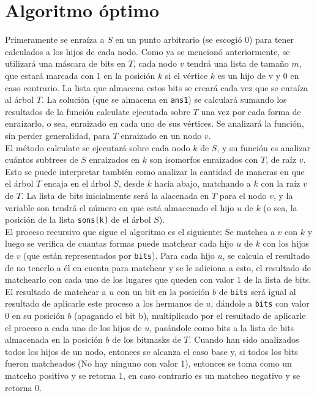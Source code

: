 \documentclass[a4paper,12pt,twocolumn]{article}
\begin{document}
	
	
	\section{Algoritmo óptimo}

		Primeramente se enraíza a $S$ en un punto arbitrario (se escogió 0) para tener calculados a los hijos de cada nodo. Como ya se mencionó anteriormente, se utilizará una máscara de bits en $T$, cada nodo $v$ tendrá una lista de tamaño $m$, que estará marcada con 1 en la posición $k$ si el vértice $k$ es un hijo de v y 0 en caso contrario. La lista que almacena estos bits se creará cada vez que se enraíza al árbol $T$.
		La solución (que se almacena en \texttt{\ttfamily ans1}) se calculará sumando los resultados de la función calculate ejecutada sobre $T$ una vez por cada forma de enraizarlo, o sea, enraizado en cada uno de sus vértices. Se analizará la función, sin perder generalidad, para $T$ enraizado en un nodo $v$.\\
		
		El método calculate se ejecutará sobre cada nodo $k$ de $S$, y su función es analizar cuántos subtrees de $S$ enraizados en $k$ son isomorfos enraizados con $T$, de raíz $v$. Esto se puede interpretar también como analizar la cantidad de maneras en que el árbol $T$ encaja en el árbol $S$, desde $k$ hacia abajo, matchando a $k$ con la raíz $v$ de $T$. La lista de bits inicialmente será la alacenada en $T$ para el nodo $v$, y la variable son tendrá el número en que está almacenado el hijo $u$ de $k$ (o sea, la posición de la lista \texttt{\ttfamily sons[k]} de el árbol $S$).  \\
		
		El proceso recursivo que sigue el algoritmo es el siguiente: Se matchea a $v$ con $k$ y luego se verifica de cuantas formas puede matchear cada hijo $u$ de $k$ con los hijos de $v$ (que están representados por \texttt{\ttfamily bits}). Para cada hijo $u$, se calcula el resultado de no tenerlo a él en cuenta para matchear y se le adiciona a esto, el resultado de matchearlo con cada uno de los lugares que queden con valor 1 de la lista de bits. El resultado de matchear a $u$ con un bit en la posición $b$ de \texttt{\ttfamily bits} será igual al resultado de aplicarle este proceso a los hermanos de $u$, dándole a \texttt{\ttfamily bits} con valor 0 en su posición $b$ (apagando el bit b), multiplicado por el resultado de aplicarle el proceso a cada uno de los hijos de $u$, pasándole como bits a la lista de bits almacenada en la posición $b$ de los bitmasks de $T$. Cuando han sido analizados todos los hijos de un nodo, entonces se alcanza el caso base y, si todos los bits fueron matcheados (No hay ninguno con valor 1), entonces se toma como un matceho positivo y se retorna 1, en caso contrario es un matcheo negativo y se retorna 0.\\
		
\end{document}
